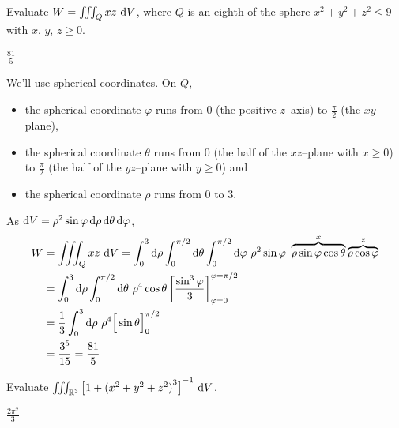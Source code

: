 \begin{question}[M200 2010D] %
Evaluate $W = \tripInt_Q xz\ \dee{V}$, where $Q$ is an eighth of the sphere 
$x^2 + y^2 + z^2 \le 9$ with $x$, $y$, $z \ge 0$.
\end{question}

%

\begin{answer}
$\frac{81}{5}$
\end{answer}

\begin{solution}
We'll use spherical coordinates.
On $Q$, 
\begin{itemize}
\item
the spherical coordinate $\varphi$ runs from $0$
(the positive $z$--axis) to $\frac{\pi}{2}$ (the $xy$--plane), 
\item
the spherical coordinate $\theta$ runs from $0$ (the half of the 
$xz$--plane with $x\ge 0$) to $\frac{\pi}{2}$ (the half of the 
$yz$--plane with $y\ge 0$) and
\item
the spherical coordinate $\rho$ runs from $0$ to $3$.
\end{itemize}
As $\mathrm{d}V=\rho^2\sin\varphi\,\mathrm{d}\rho\,\mathrm{d}\theta\,\mathrm{d}\varphi$,
\begin{align*}
W&= \tripInt_Q xz\ \dee{V}
=\int_0^3 \dee{\rho} \int_0^{\pi/2}\dee{\theta}\int_0^{\pi/2}\dee{\varphi}
\ \rho^2\sin\varphi\ \overbrace{\rho\sin\varphi\cos\theta}^{x}
  \overbrace{\rho\cos\varphi}^{z} \\
&=\int_0^3 \dee{\rho} \int_0^{\pi/2}\dee{\theta}
\ \rho^4\cos\theta\left[\frac{\sin^3\varphi}{3}\right]
        _{\varphi=0}^{\varphi=\pi/2} \\
&=\frac{1}{3}\int_0^3 \dee{\rho}\ \rho^4\Big[\sin\theta\Big]_0^{\pi/2} \\
&=\frac{3^5}{15}=\frac{81}{5}
\end{align*}
\end{solution}

\begin{question}[M200 2012A] %
Evaluate $\tripInt_{\bbbr^3}  {\big[1+{(x^2+y^2+z^2)}^3\big]}^{-1}\ \dee{V}$.
\end{question}

%

\begin{answer}
$\frac{2\pi^2}{3}$
\end{answer}

